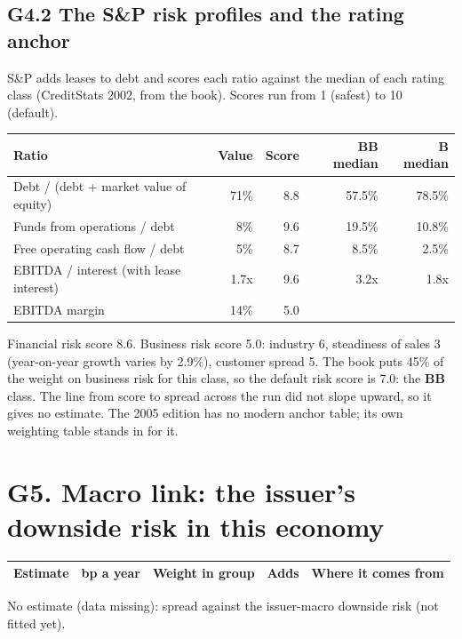 \documentclass[11pt,a4paper]{article}
\begin{document}
\subsection*{G4.2 The S\&P risk profiles and the rating anchor}
S\&P adds leases to debt and scores each ratio against the median of each rating class (CreditStats 2002, from the book). Scores run from 1 (safest) to 10 (default).
\begin{center}\footnotesize\setlength{\tabcolsep}{3.5pt}\begin{tabular}{@{}lrrrr@{}}\toprule
Ratio & Value & Score & BB median & B median \\\midrule
Debt / (debt + market value of equity) & 71\% & 8.8 & 57.5\% & 78.5\% \\
Funds from operations / debt & 8\% & 9.6 & 19.5\% & 10.8\% \\
Free operating cash flow / debt & 5\% & 8.7 & 8.5\% & 2.5\% \\
EBITDA / interest (with lease interest) & 1.7x & 9.6 & 3.2x & 1.8x \\
EBITDA margin & 14\% & 5.0 &  &  \\
\bottomrule\end{tabular}\end{center}
Financial risk score 8.6. Business risk score 5.0: industry 6, steadiness of sales 3 (year-on-year growth varies by 2.9\%), customer spread 5. The book puts 45\% of the weight on business risk for this class, so the default risk score is 7.0: the \textbf{BB} class. The line from score to spread across the run did not slope upward, so it gives no estimate. The 2005 edition has no modern anchor table; its own weighting table stands in for it.
\section*{G5. Macro link: the issuer's downside risk in this economy}
\par\noindent{}
\begin{center}\footnotesize\setlength{\tabcolsep}{3.5pt}\begin{tabular}{@{}p{6.2cm}rrrp{4.2cm}@{}}\toprule
Estimate & bp a year & Weight in group & Adds & Where it comes from \\\midrule
\bottomrule\end{tabular}\end{center}
No estimate (data missing): spread against the issuer-macro downside risk (not fitted yet).
\end{document}
